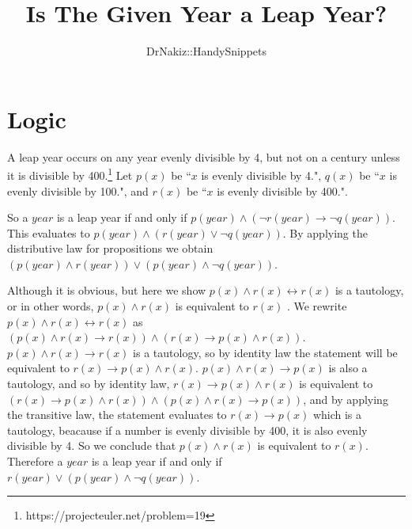 \documentclass{article}
\author{DrNakiz::HandySnippets}
\title{Is The Given Year a Leap Year?}
\begin{document}
\maketitle

\section{Logic}

A leap year occurs on any year evenly divisible by 4, but not on a century 
unless it is divisible by 400.\footnote{https://projecteuler.net/problem=19}
Let $p(x)$ be ``$x$ is evenly divisible by 4.", $q(x)$ be ``$x$ is evenly
divisible by 100.", and $r(x)$ be ``$x$ is evenly divisible by 400.".

So a $year$ is a leap year if and only if $p(year)\wedge(\neg r(year)
\rightarrow \neg q(year))$. This evaluates to $p(year)\wedge(r(year)\vee \neg 
q(year))$. By applying the distributive law for propositions we obtain $(p(year
)\wedge r(year)) \vee (p(year)\wedge \neg q(year))$.

Although it is obvious, but here we show $p(x) \wedge r(x) \leftrightarrow r(x)
$ is a tautology, or in other words, $p(x) \wedge r(x)$ is equivalent to $r(x)$
. We rewrite $p(x) \wedge r(x) \leftrightarrow r(x)$ as $(p(x) \wedge r(x) 
\rightarrow r(x)) \wedge (r(x) \rightarrow p(x) \wedge r(x))$. $p(x) \wedge
r(x) \rightarrow r(x)$ is a tautology, so by identity law the statement will be
equivalent to $r(x) \rightarrow p(x) \wedge r(x)$. $p(x) \wedge r(x)\rightarrow
p(x)$ is also a tautology, and so by identity law, $r(x) \rightarrow p(x) 
\wedge r(x)$ is equivalent to $(r(x) \rightarrow p(x) \wedge r(x)) \wedge (p(x)
\wedge r(x) \rightarrow p(x))$, and by applying the transitive law, the 
statement evaluates to $r(x) \rightarrow p(x)$ which is a tautology, beacause 
if a number is evenly divisible by 400, it is also evenly divisible by 4. So we
conclude that $p(x) \wedge r(x)$ is equivalent to $r(x)$. Therefore a $year$ is
a leap year if and only if $r(year) \vee (p(year)\wedge \neg q(year))$.
\end{document}
